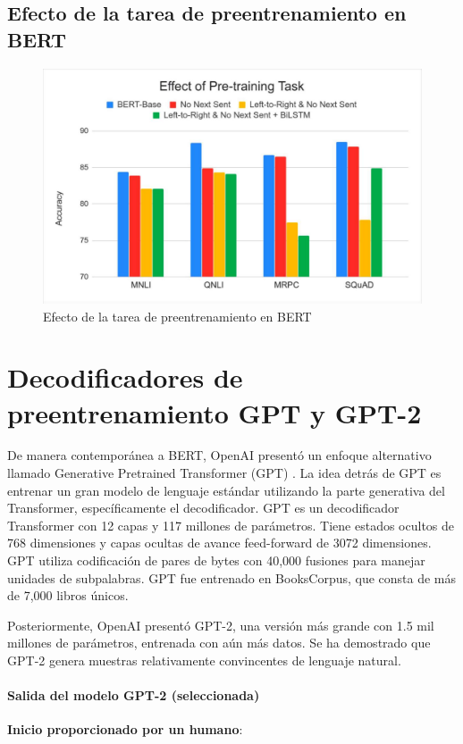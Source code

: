 \subsection{Efecto de la tarea de preentrenamiento en BERT}

\begin{figure}[h]
  \centering
  \includegraphics[scale=0.2]{pics/BERTeffect.png}
  \caption{Efecto de la tarea de preentrenamiento en BERT}
\end{figure}

\section{Decodificadores de preentrenamiento GPT y GPT-2}
 De manera contemporánea a BERT, OpenAI presentó un enfoque alternativo llamado Generative Pretrained Transformer (GPT) \cite{radford2018improving}. La idea detrás de GPT es entrenar un gran modelo de lenguaje estándar utilizando la parte generativa del Transformer, específicamente el decodificador. GPT es un decodificador Transformer con 12 capas y 117 millones de parámetros.
Tiene estados ocultos de 768 dimensiones y capas ocultas de avance feed-forward de 3072 dimensiones. GPT utiliza codificación de pares de bytes con 40,000 fusiones para manejar unidades de subpalabras. GPT fue entrenado en BooksCorpus, que consta de más de 7,000 libros únicos.

Posteriormente, OpenAI presentó GPT-2, una versión más grande con 1.5 mil millones de parámetros, entrenada con aún más datos. Se ha demostrado que GPT-2 genera muestras relativamente convincentes de lenguaje natural.


\paragraph{Salida del modelo GPT-2 (seleccionada)}
\textbf{Inicio proporcionado por un humano}:

